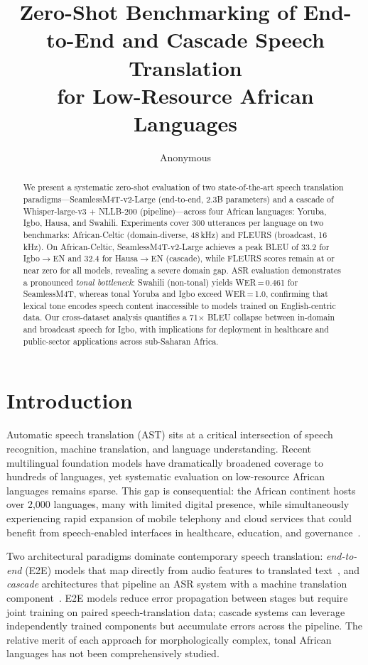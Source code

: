 \documentclass[11pt,a4paper]{article}
\title{Zero-Shot Benchmarking of End-to-End and Cascade Speech Translation\\
for Low-Resource African Languages}
\author{Anonymous}
\date{}
\newcommand{\modelSM}{SeamlessM4T-v2-Large}
\newcommand{\modelWN}{Whisper-large-v3 + NLLB-200}
\newcommand{\dataAC}{African-Celtic}
\newcommand{\dataFL}{FLEURS}
\begin{document}
\maketitle

\begin{abstract}
We present a systematic zero-shot evaluation of two state-of-the-art speech translation paradigms—\modelSM{} (end-to-end, 2.3B parameters) and a cascade of \modelWN{} (pipeline)—across four African languages: Yoruba, Igbo, Hausa, and Swahili. Experiments cover 300 utterances per language on two benchmarks: \dataAC{} (domain-diverse, 48\,kHz) and \dataFL{} (broadcast, 16\,kHz). On \dataAC{}, \modelSM{} achieves a peak BLEU of 33.2 for Igbo$\to$EN and 32.4 for Hausa$\to$EN (cascade), while FLEURS scores remain at or near zero for all models, revealing a severe domain gap. ASR evaluation demonstrates a pronounced \emph{tonal bottleneck}: Swahili (non-tonal) yields WER\,=\,0.461 for SeamlessM4T, whereas tonal Yoruba and Igbo exceed WER\,=\,1.0, confirming that lexical tone encodes speech content inaccessible to models trained on English-centric data. Our cross-dataset analysis quantifies a 71$\times$ BLEU collapse between in-domain and broadcast speech for Igbo, with implications for deployment in healthcare and public-sector applications across sub-Saharan Africa.
\end{abstract}

\section{Introduction}
\label{sec:intro}

Automatic speech translation (AST) sits at a critical intersection of speech recognition, machine translation, and language understanding. Recent multilingual foundation models have dramatically broadened coverage to hundreds of languages, yet systematic evaluation on low-resource African languages remains sparse. This gap is consequential: the African continent hosts over 2,000 languages, many with limited digital presence, while simultaneously experiencing rapid expansion of mobile telephony and cloud services that could benefit from speech-enabled interfaces in healthcare, education, and governance~\citep{nekoto2020participatory,ogueji2021small}.

Two architectural paradigms dominate contemporary speech translation: \emph{end-to-end} (E2E) models that map directly from audio features to translated text~\citep{barrault2023seamlessm4t}, and \emph{cascade} architectures that pipeline an ASR system with a machine translation component~\citep{radford2023whisper,costa-jussa-etal-2022-no}. E2E models reduce error propagation between stages but require joint training on paired speech-translation data; cascade systems can leverage independently trained components but accumulate errors across the pipeline. The relative merit of each approach for morphologically complex, tonal African languages has not been comprehensively studied.
\end{document}
